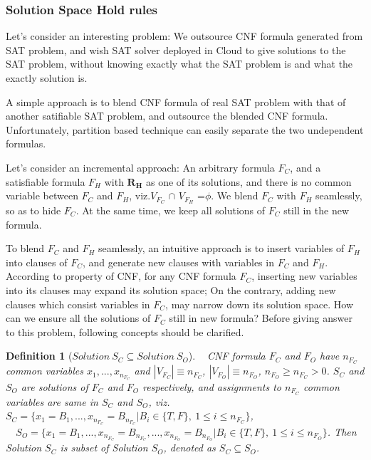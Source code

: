 \documentclass[conference,compsocconf]{IEEEtran}
\newtheorem{definition}{\textbf{Definition}}
\begin{document}
\subsubsection{Solution Space Hold rules}\label{embeded rules}
Let's consider an interesting problem:
We outsource CNF formula generated from SAT problem, 
and wish SAT solver deployed in Cloud to give solutions to the SAT problem,
without knowing exactly what the SAT problem is and what the exactly solution is.

A simple approach is to blend CNF formula of real SAT problem with that of another satifiable SAT problem,
and outsource the blended CNF formula.
Unfortunately, partition based technique \cite{Partition} can easily separate the two undependent formulas. 

Let's consider an incremental approach:
An arbitrary formula $F_C$,
and a satisfiable formula $F_H$ with \textsl{${\textbf{R}}_{\textbf{H}}$} as one of its solutions,
and there is no common variable between $F_C$ and $F_H$, viz.$V_{F_C}$ $\cap$ $V_{F_H}$ =$\phi$.
We blend $F_C$ with $F_H$ seamlessly, so as to hide $F_C$.
At the same time, we keep all solutions of $F_C$ still in the new formula. 

To blend $F_C$ and $F_H$ seamlessly,
an intuitive approach is to insert variables of $F_H$ into clauses of $F_C$, 
and generate new clauses with variables in $F_C$ and $F_H$. According to property of CNF, for any CNF formula $F_C$, 
inserting new variables into its clauses may expand its solution space; 
On the contrary,
adding new clauses which consist variables in $F_C$,
may narrow down its solution space. 
How can we ensure all the solutions of $F_C$ still in new formula?
Before giving answer to this problem,
following concepts should be clarified.

\begin{definition}[$ Solution~S_C \subseteq Solution~S_O$]~
CNF formula $F_C$ and $F_O$ have $n_{F_C}$ common variables $x_1,...,x_{n_{F_C}}$ and
$|V_{F_C}|\equiv n_{F_C}$, $|V_{F_O}|\equiv n_{F_O}$, $ n_{F_O}\geqslant n_{F_C} > 0$.
$S_C$ and $S_O$ are solutions of $F_C$ and $F_O$ respectively, 
and assignments to $n_{F_C}$ common variables are same in $S_C$ and $S_O$, viz.
~~$S_C=\{x_1=B_1,...,x_{n_{F_C}}=B_{n_{F_C}} | B_i \in \{T,F\},~1\leqslant i\leqslant n_{F_C} \}$,\\
~~$S_O=\{x_1=B_1,...,x_{n_{F_C}}=B_{n_{F_C}},...,x_{n_{F_O}}=B_{n_{F_O}}|B_i\in \{T,F\},~ 1\leqslant i\leqslant n_{F_O} \}$.
Then Solution $S_C$ is subset of Solution $S_O$,
denoted as $S_C \subseteq S_O$.
\end{definition}
\end{document}
